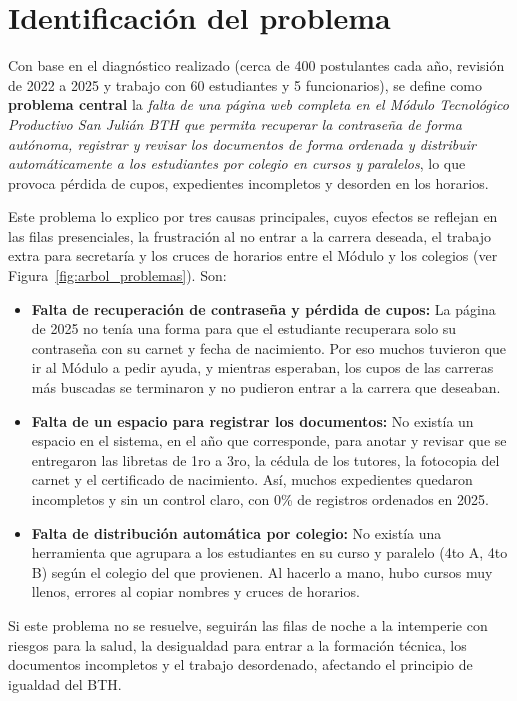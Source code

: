 \section{Identificación del problema}
\label{sec:identificacion_problema}

Con base en el diagnóstico realizado (cerca de 400 postulantes cada año, revisión de 2022 a 2025 y trabajo con 60 estudiantes y 5 funcionarios), se define como \textbf{problema central} la \textit{falta de una página web completa en el Módulo Tecnológico Productivo San Julián BTH que permita recuperar la contraseña de forma autónoma, registrar y revisar los documentos de forma ordenada y distribuir automáticamente a los estudiantes por colegio en cursos y paralelos}, lo que provoca pérdida de cupos, expedientes incompletos y desorden en los horarios.

Este problema lo explico por tres causas principales, cuyos efectos se reflejan en las filas presenciales, la frustración al no entrar a la carrera deseada, el trabajo extra para secretaría y los cruces de horarios entre el Módulo y los colegios (ver Figura~\ref{fig:arbol_problemas}). Son:

\begin{itemize}
    \item \textbf{Falta de recuperación de contraseña y pérdida de cupos:} La página de 2025 no tenía una forma para que el estudiante recuperara solo su contraseña con su carnet y fecha de nacimiento. Por eso muchos tuvieron que ir al Módulo a pedir ayuda, y mientras esperaban, los cupos de las carreras más buscadas se terminaron y no pudieron entrar a la carrera que deseaban.
    \item \textbf{Falta de un espacio para registrar los documentos:} No existía un espacio en el sistema, en el año que corresponde, para anotar y revisar que se entregaron las libretas de 1ro a 3ro, la cédula de los tutores, la fotocopia del carnet y el certificado de nacimiento. Así, muchos expedientes quedaron incompletos y sin un control claro, con 0\% de registros ordenados en 2025.
    \item \textbf{Falta de distribución automática por colegio:} No existía una herramienta que agrupara a los estudiantes en su curso y paralelo (4to A, 4to B) según el colegio del que provienen. Al hacerlo a mano, hubo cursos muy llenos, errores al copiar nombres y cruces de horarios.
\end{itemize}

Si este problema no se resuelve, seguirán las filas de noche a la intemperie con riesgos para la salud, la desigualdad para entrar a la formación técnica, los documentos incompletos y el trabajo desordenado, afectando el principio de igualdad del BTH.

